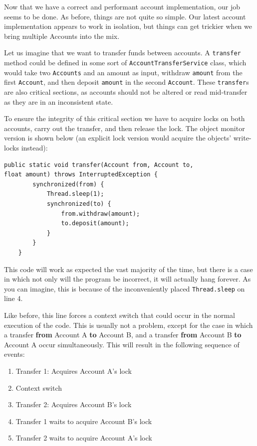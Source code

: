 \documentclass[a4paper,12pt]{kth-mag}
\begin{document}
Now that we have a correct and performant account implementation, our job seems to be done. As before, things are not quite so simple. Our latest account implementation appears to work in isolation, but things can get trickier when we bring multiple Accounts into the mix.

Let us imagine that we want to transfer funds between accounts. A \texttt{transfer} method could be defined in some sort of \texttt{AccountTransferService} class, which would take two \texttt{Accounts} and an amount as input, withdraw \texttt{amount} from the first \texttt{Account}, and then deposit \texttt{amount} in the second \texttt{Account}. These \texttt{transfer}s are also critical sections, as accounts should not be altered or read mid-transfer as they are in an inconsistent state.

To ensure the integrity of this critical section we have to acquire locks on both accounts, carry out the transfer, and then release the lock. The object monitor version is shown below (an explicit lock version would acquire the objects' write-locks instead):

\begin{listing}[H]
	\begin{verbatim}
public static void transfer(Account from, Account to,
float amount) throws InterruptedException {
        synchronized(from) {
            Thread.sleep(1);
            synchronized(to) {
                from.withdraw(amount);
                to.deposit(amount);
            }
        }
    }
	\end{verbatim}
\end{listing}

This code will work as expected the vast majority of the time, but there is a case in which not only will the program be incorrect, it will actually hang forever. As you can imagine, this is because of the inconveniently placed \texttt{Thread.sleep} on line 4. 

Like before, this line forces a context switch that could occur in the normal execution of the code. This is usually not a problem, except for the case in which a transfer \textbf{from} Account A \textbf{to} Account B, and a transfer \textbf{from} Account B \textbf{to} Account A occur simultaneously. This will result in the following sequence of events:

\begin{enumerate}
\item Transfer 1: Acquires Account A's lock
\item Context switch
\item Transfer 2: Acquires Account B's lock
\item Transfer 1 waits to acquire Account B's lock
\item Transfer 2 waits to acquire Account A's lock
\end{enumerate}
\end{document}
